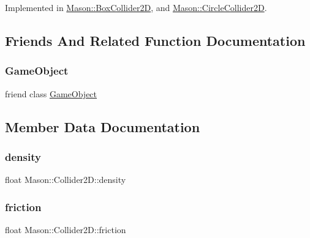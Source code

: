 Implemented in \hyperlink{class_mason_1_1_box_collider2_d_a396aa615690a67c855b5025e3a1b3bce}{Mason\+::\+Box\+Collider2D}, and \hyperlink{class_mason_1_1_circle_collider2_d_a4aa06f3ff8f00445a78f6b6a8b479ad0}{Mason\+::\+Circle\+Collider2D}.



\subsection{Friends And Related Function Documentation}
\hypertarget{class_mason_1_1_collider2_d_a00df87c957d8f7ee0fc51f07a0542f4a}{}\label{class_mason_1_1_collider2_d_a00df87c957d8f7ee0fc51f07a0542f4a} 
\subsubsection{\texorpdfstring{Game\+Object}{GameObject}}
{\footnotesize\ttfamily friend class \hyperlink{class_mason_1_1_game_object}{Game\+Object}\hspace{0.3cm}{\ttfamily [friend]}}



\subsection{Member Data Documentation}
\hypertarget{class_mason_1_1_collider2_d_ad3b9178c829dbe0a8a25a75d643f8744}{}\label{class_mason_1_1_collider2_d_ad3b9178c829dbe0a8a25a75d643f8744} 
\subsubsection{\texorpdfstring{density}{density}}
{\footnotesize\ttfamily float Mason\+::\+Collider2\+D\+::density}

\hypertarget{class_mason_1_1_collider2_d_ab08954cffa1ac7539e26c4e2da535481}{}\label{class_mason_1_1_collider2_d_ab08954cffa1ac7539e26c4e2da535481} 
\subsubsection{\texorpdfstring{friction}{friction}}
{\footnotesize\ttfamily float Mason\+::\+Collider2\+D\+::friction}

